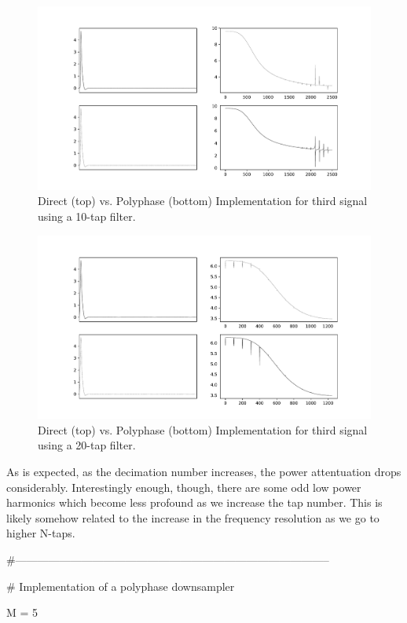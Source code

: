 \documentclass{report}
\begin{document}
\begin{figure}[!ht]
\includegraphics[scale=.45]{Figure_13.pdf}
\caption{Direct (top) vs. Polyphase (bottom) Implementation for third signal using a 10-tap filter.}
\end{figure} 

\begin{figure}[!ht]
\includegraphics[scale=.45]{Figure_14.pdf}
\caption{Direct (top) vs. Polyphase (bottom) Implementation for third signal using a 20-tap filter.}
\end{figure} 

As is expected, as the decimation number increases, the power attentuation drops considerably.  Interestingly enough, though, there are some odd low power harmonics which become less profound as we increase the tap number.  This is likely somehow related to the increase in the frequency resolution as we go to higher N-taps.

\#--------------------------------------------------------------------------------------

\# Implementation of a polyphase downsampler

M = 5
\end{document}

